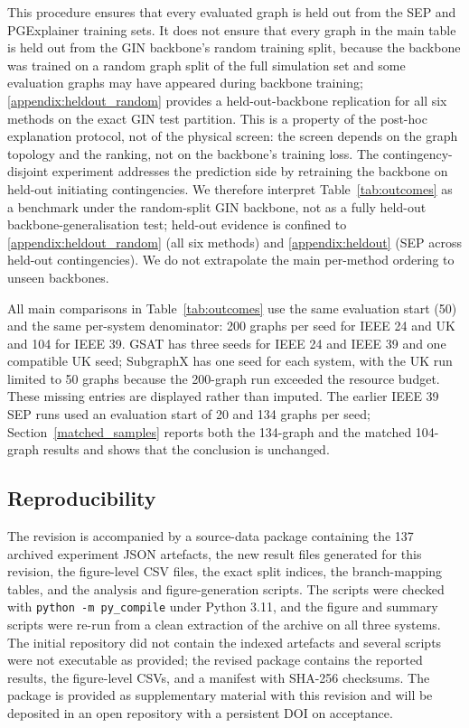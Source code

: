 This procedure ensures that every evaluated graph is held out from the SEP and PGExplainer training sets. It does not ensure that every graph in the main table is held out from the GIN backbone's random training split, because the backbone was trained on a random graph split of the full simulation set and some evaluation graphs may have appeared during backbone training; \ref{appendix:heldout_random} provides a held-out-backbone replication for all six methods on the exact GIN test partition. This is a property of the post-hoc explanation protocol, not of the physical screen: the screen depends on the graph topology and the ranking, not on the backbone's training loss. The contingency-disjoint experiment addresses the prediction side by retraining the backbone on held-out initiating contingencies. We therefore interpret Table~\ref{tab:outcomes} as a benchmark under the random-split GIN backbone, not as a fully held-out backbone-generalisation test; held-out evidence is confined to \ref{appendix:heldout_random} (all six methods) and \ref{appendix:heldout} (SEP across held-out contingencies). We do not extrapolate the main per-method ordering to unseen backbones.

All main comparisons in Table~\ref{tab:outcomes} use the same evaluation start (50) and the same per-system denominator: 200 graphs per seed for IEEE 24 and UK and 104 for IEEE 39. GSAT has three seeds for IEEE 24 and IEEE 39 and one compatible UK seed; SubgraphX has one seed for each system, with the UK run limited to 50 graphs because the 200-graph run exceeded the resource budget. These missing entries are displayed rather than imputed. The earlier IEEE 39 SEP runs used an evaluation start of 20 and 134 graphs per seed; Section~\ref{matched_samples} reports both the 134-graph and the matched 104-graph results and shows that the conclusion is unchanged.

\subsection{Reproducibility}\label{reproducibility}

The revision is accompanied by a source-data package containing the 137 archived experiment JSON artefacts, the new result files generated for this revision, the figure-level CSV files, the exact split indices, the branch-mapping tables, and the analysis and figure-generation scripts. The scripts were checked with \texttt{python -m py\_compile} under Python 3.11, and the figure and summary scripts were re-run from a clean extraction of the archive on all three systems. The initial repository did not contain the indexed artefacts and several scripts were not executable as provided; the revised package contains the reported results, the figure-level CSVs, and a manifest with SHA-256 checksums. The package is provided as supplementary material with this revision and will be deposited in an open repository with a persistent DOI on acceptance.

